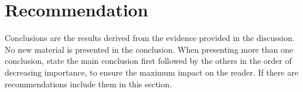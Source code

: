 \section{Recommendation}
	Conclusions are the results derived from the evidence provided in the discussion. No new material is presented in the conclusion. When presenting more than one conclusion, state the main conclusion first followed by the others in the order of decreasing importance, to ensure the maximum impact on the reader. If there are recommendations include them in this section.
 